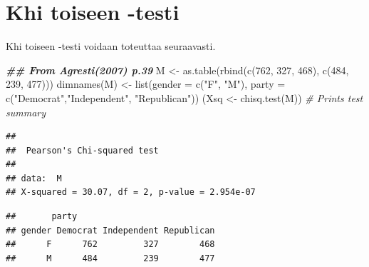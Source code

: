 \documentclass[
]{book}
\newenvironment{Shaded}{\begin{snugshade}}{\end{snugshade}}
\newcommand{\AttributeTok}[1]{\textcolor[rgb]{0.77,0.63,0.00}{#1}}
\newcommand{\CommentTok}[1]{\textcolor[rgb]{0.56,0.35,0.01}{\textit{#1}}}
\newcommand{\DecValTok}[1]{\textcolor[rgb]{0.00,0.00,0.81}{#1}}
\newcommand{\DocumentationTok}[1]{\textcolor[rgb]{0.56,0.35,0.01}{\textbf{\textit{#1}}}}
\newcommand{\FunctionTok}[1]{\textcolor[rgb]{0.00,0.00,0.00}{#1}}
\newcommand{\NormalTok}[1]{#1}
\newcommand{\OtherTok}[1]{\textcolor[rgb]{0.56,0.35,0.01}{#1}}
\newcommand{\SpecialCharTok}[1]{\textcolor[rgb]{0.00,0.00,0.00}{#1}}
\newcommand{\StringTok}[1]{\textcolor[rgb]{0.31,0.60,0.02}{#1}}
\begin{document}
\hypertarget{chi-squared-test}{%
\section{Khi toiseen -testi}\label{chi-squared-test}}

Khi toiseen -testi voidaan toteuttaa seuraavasti.

\begin{Shaded}
\begin{Highlighting}[]
\DocumentationTok{\#\# From Agresti(2007) p.39}
\NormalTok{M }\OtherTok{\textless{}{-}} \FunctionTok{as.table}\NormalTok{(}\FunctionTok{rbind}\NormalTok{(}\FunctionTok{c}\NormalTok{(}\DecValTok{762}\NormalTok{, }\DecValTok{327}\NormalTok{, }\DecValTok{468}\NormalTok{), }\FunctionTok{c}\NormalTok{(}\DecValTok{484}\NormalTok{, }\DecValTok{239}\NormalTok{, }\DecValTok{477}\NormalTok{)))}
\FunctionTok{dimnames}\NormalTok{(M) }\OtherTok{\textless{}{-}} \FunctionTok{list}\NormalTok{(}\AttributeTok{gender =} \FunctionTok{c}\NormalTok{(}\StringTok{"F"}\NormalTok{, }\StringTok{"M"}\NormalTok{),}
                    \AttributeTok{party =} \FunctionTok{c}\NormalTok{(}\StringTok{"Democrat"}\NormalTok{,}\StringTok{"Independent"}\NormalTok{, }\StringTok{"Republican"}\NormalTok{))}
\NormalTok{(Xsq }\OtherTok{\textless{}{-}} \FunctionTok{chisq.test}\NormalTok{(M))  }\CommentTok{\# Prints test summary}
\end{Highlighting}
\end{Shaded}

\begin{verbatim}
## 
##  Pearson's Chi-squared test
## 
## data:  M
## X-squared = 30.07, df = 2, p-value = 2.954e-07
\end{verbatim}

\begin{Shaded}
\end{Shaded}

\begin{verbatim}
##       party
## gender Democrat Independent Republican
##      F      762         327        468
##      M      484         239        477
\end{verbatim}

\begin{Shaded}
\end{Shaded}
\end{document}
